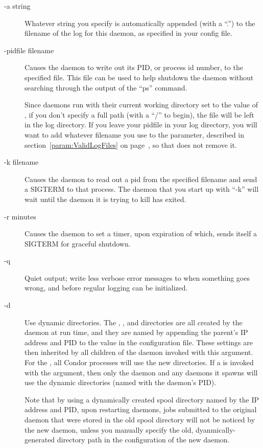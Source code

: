 \begin{description}
\item[-a string] Whatever string you specify is automatically
  appended (with a ``.'') to the filename of the log for this daemon,
  as specified in your config file.

\item[-pidfile filename] Causes the daemon to write out its PID, or
  process id number, to the specified file.  This file can be used to
  help shutdown the daemon without searching through the output of the
  ``ps'' command.

  Since daemons run with their current working directory set to the
  value of , if you don't specify a full path (with a ``/''
  to begin), the file will be left in the log directory.  If you leave
  your pidfile in your log directory, you will want to add whatever
  filename you use to the  parameter,
  described in section~\ref{param:ValidLogFiles} on
  page~\pageref{param:ValidLogFiles}, so that  does not
  remove it.

\item[-k filename] Causes the daemon to read out a pid from the
  specified filename and send a SIGTERM to that process.  The daemon
  that you start up with ``-k'' will wait until the daemon it is
  trying to kill has exited.  

\item[-r minutes] Causes the daemon to set a timer, upon expiration
  of which, sends itself a SIGTERM for graceful shutdown.

\item[-q] Quiet output; write less verbose error
 messages to  when something goes wrong,
 and before regular logging can be initialized.

\item[-d] Use dynamic directories.
 The , , and  directories
 are all created by the daemon at run time,
 and they are named by appending the
 parent's IP address and PID to the value in the 
 configuration file.
 These settings are then inherited by all children of the daemon
 invoked with this  argument.
 For the ,
 all Condor processes will use the new directories.
 If a  is invoked with the  argument,
 then only the  daemon and any
  daemons it spawns will use the dynamic
 directories (named with the  daemon's PID).

 Note that by using a dynamically created spool directory
 named by the IP address and PID,
 upon restarting daemons,
 jobs submitted to the original  daemon
 that were stored in the old spool directory will not be noticed
 by the new  daemon,
 unless you manually specify the old, dyanmically-generated 
  directory path in the configuration of the
 new  daemon.

\end{description}

